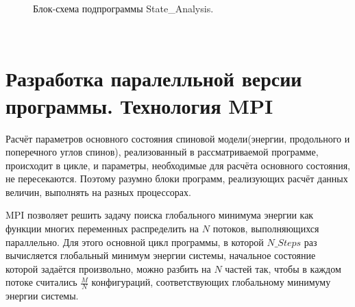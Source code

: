 \documentclass[14pt,a4paper,report]{ncc}
\begin{document}
\begin{figure}[p]
\caption{Блок-схема подпрограммы State\_Analysis.}
\label{ris:image2}
\end{figure}
\

\newpage
\section{Разработка паралелльной версии программы. Технология MPI}

Расчёт параметров основного состояния спиновой модели(энергии, продольного и поперечного углов спинов), реализованный в рассматриваемой программе, происходит в цикле, и параметры, необходимые для расчёта основного состояния, не пересекаются. Поэтому разумно блоки программ, реализующих расчёт данных величин, выполнять на разных процессорах. 
\


MPI позволяет решить задачу поиска глобального минимума энергии как функции многих переменных распределить на $N$ потоков, выполняющихся параллельно. Для этого основной цикл программы, в которой $N\_Steps$ раз вычисляется глобальный минимум энергии системы, начальное состояние которой задаётся произвольно, можно разбить на $N$ частей так, чтобы в каждом потоке считались $\frac{M}{N}$ конфигураций, соответствующих глобальному минимуму энергии системы.
\
\end{document}
